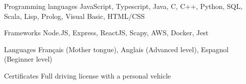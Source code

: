 
\begin{cvskills}
  \cvskill
    {Programming languages} %
    {JavaScript, Typescript, Java, C, C++, Python, SQL, Scala, Lisp, Prolog, Visual Basic, HTML/CSS} %

  \cvskill
    {Frameworks} %
    {Node.JS, Express, ReactJS, Scapy, AWS, Docker, Jest} %
    
  \cvskill
    {Languages} %
    {Français (Mother tongue), Anglais (Advanced level), Espagnol (Beginner level)} %
    
  \cvskill
    {Certificates} %
    {Full driving license with a personal vehicle} %
\end{cvskills}
